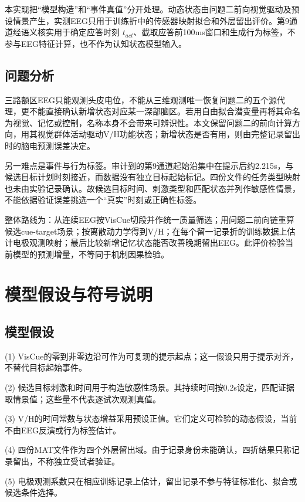 \documentclass[UTF8,a4paper,12pt]{ctexart}
\begin{document}
本实现把“模型构造”和“事件真值”分开处理。动态状态由问题二前向视觉驱动及预设情景产生，实测EEG只用于训练折中的传感器映射拟合和外层留出评价。第9通道经语义核实用于确定应答时刻 \(t_{act}\)、截取应答前100ms窗口和生成行为标签，不参与EEG特征计算，也不作为认知状态模型输入。

\subsection{问题分析}

三路额区EEG只能观测头皮电位，不能从三维观测唯一恢复问题二的五个源代理，更不能直接确认新增状态对应某一深部脑区。若用自由拟合潜变量再将其命名为视觉、记忆或控制，名称本身不会带来可辨识性。本文保留问题二的前向计算方向，用其视觉群体活动驱动V/H功能状态；新增状态是否有用，则由完整记录留出时的脑电预测误差决定。

另一难点是事件与行为标签。审计到的第9通道起始沿集中在提示后约2.215s，与候选目标计划时刻接近，而数据没有独立目标起始标记。四份文件的任务类型映射也未由实验记录确认。故候选目标时间、刺激类型和匹配状态并列作敏感性情景，不能依据验证误差挑选一个“真实”时刻或正确性标签。

整体路线为：从连续EEG按VisCue切段并作统一质量筛选；用问题二前向链重算候选cue-target场景；按离散动力学得到V/H；在每个留一记录折的训练数据上估计电极观测映射；最后比较新增记忆状态能否改善晚期留出EEG。此评价检验当前模型的预测增量，不等同于机制因果检验。

\section{模型假设与符号说明}

\subsection{模型假设}

(1) VisCue的零到非零边沿可作为可复现的提示起点；这一假设只用于提示对齐，不替代目标起始事件。

(2) 候选目标刺激和时间用于构造敏感性场景。其持续时间按0.2s设定，匹配证据取情景值；这些量不代表逐试次观测真值。

(3) V/H的时间常数与状态增益采用预设正值。它们定义可检验的动态假设，当前不由EEG反演或行为标签估计。

(4) 四份MAT文件作为四个外层留出域。由于记录身份未能确认，四折结果只称记录留出，不称独立受试者验证。

(5) 电极观测系数只在相应训练记录上估计，留出记录不参与特征标准化、拟合或候选条件选择。
\end{document}
